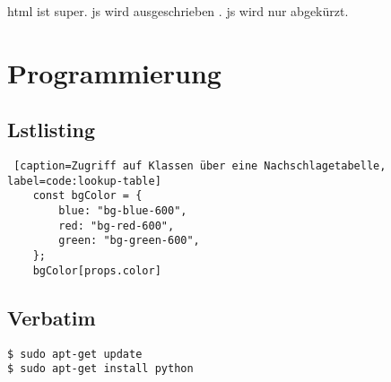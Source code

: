 \ac{html} ist super. \acf{js} wird ausgeschrieben . \acs{js} wird nur abgekürzt.

\chapter{Programmierung}

\section{Lstlisting}

\begin{lstlisting} [caption=Zugriff auf Klassen über eine Nachschlagetabelle, label=code:lookup-table]
    const bgColor = {
        blue: "bg-blue-600",
        red: "bg-red-600",
        green: "bg-green-600",
    };
    bgColor[props.color]
\end{lstlisting}

\section{Verbatim}

\begin{verbatim}
$ sudo apt-get update
$ sudo apt-get install python
\end{verbatim}
